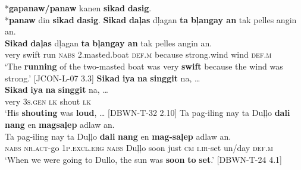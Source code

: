 *\textbf{gapanaw/panaw} kanen \textbf{sikad} \textbf{dasig}. \\
*\textbf{panaw} din \textbf{sikad} \textbf{dasig}.
\z
\ea
\textbf{Sikad}  \textbf{daļas}  {dļagan}  \textbf{ta}  \textbf{bļangay  an}  tak  pelles  angin  an. \\\smallskip
 \gll \textbf{Sikad}  \textbf{daļas}  {dļagan}  \textbf{ta}  \textbf{bļangay  an}  tak  pelles  angin  an. \\
very  swift  run  \textsc{nabs}  2.masted.boat  \textsc{def.m}  because  strong.wind  wind  \textsc{def.m} \\
\glt ‘The \textbf{running} of the two-masted boat was very \textbf{swift} because the wind was strong.’ [JCON-L-07 3.3]
\z
\ea
\label{bkm:Ref481732330}
\textbf{Sikad}  \textbf{iya}  \textbf{na}  \textbf{singgit}  na, … \\\smallskip
 \gll \textbf{Sikad}  \textbf{iya}  \textbf{na}  \textbf{singgit}  na, … \\
very  3\textsc{s.gen}  \textsc{lk}  shout  \textsc{lk} \\
\glt ‘His \textbf{shouting} was \textbf{loud}, …  [DBWN-T-32 2.10]
\z
\ea
Ta  pag-iling  nay  ta  Duļļo  \textbf{dali}  \textbf{nang}  en  \textbf{magsaļep} adlaw  an. \\\smallskip
 \gll Ta  pag-iling  nay  ta  Duļļo  \textbf{dali}  \textbf{nang}  en  \textbf{mag-saļep} adlaw  an. \\
\textsc{nabs}  \textsc{nr.act}-go  1\textsc{p.excl.erg}  \textsc{nabs}  Duļļo  soon  just  \textsc{cm}  \textsc{i.ir}-set un/day  \textsc{def.m} \\
\glt ‘When we were going to Dullo, the sun was \textbf{soon} \textbf{to} \textbf{set}.’ [DBWN-T-24 4.1] \\\smallskip

